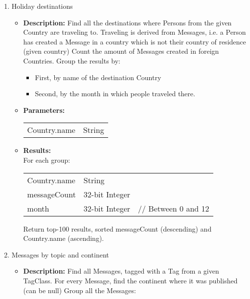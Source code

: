 {\begin{enumerate}
                  \item Holiday destinations 
            \begin{itemize}
                \item \textbf{Description:}
                  Find all the destinations where Persons from the given Country are traveling to.  Traveling is derived
                  from Messages, i.e. a Person has created a Message in a country which is not their country of
                  residence (given country) Count the amount of Messages created in foreign Countries.  Group the
                  results by:
                  \begin{itemize}
                    \item First, by name of the destination Country
                    \item Second, by the month in which people traveled there.
                  \end{itemize}

                \item \textbf{Parameters:} \\
                    \begin{tabular}{ll}
                      Country.name & String \\
                    \end{tabular}
                \item \textbf{Results:} \\
                  For each group:

                    \begin{tabular}{lll}
                      Country.name & String & \\
                      messageCount & 32-bit Integer & \\
                      month & 32-bit Integer &  \parbox[t]{20cm}{ // Between 0 and 12 \strut}  \\
                    \end{tabular}

                    Return top-100 results, sorted messageCount (descending) and Country.name (ascending).
                    \end{itemize}


                  \item Messages by topic and continent 
            \begin{itemize}
                \item \textbf{Description:}
                  Find all Messages, tagged with a Tag from a given TagClass.
                  For every Message, find the continent where it was published (can be null)
                  Group all the Messages:


\end{itemize}
\end{enumerate}}

